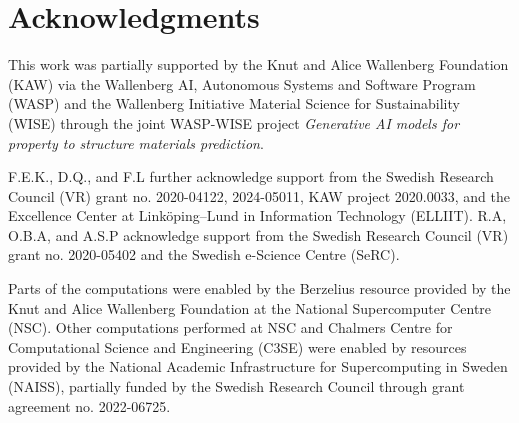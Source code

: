 \section*{Acknowledgments}

This work was partially supported by
the Knut and Alice Wallenberg Foundation (KAW)
via the
Wallenberg AI, Autonomous Systems and Software Program (WASP)
and the
Wallenberg Initiative Material Science for Sustainability (WISE)
through the joint WASP-WISE project \textit{Generative AI models for property to structure materials prediction}.


F.E.K., D.Q., and F.L further acknowledge support from the Swedish Research Council (VR) grant no. 2020-04122, 2024-05011,
KAW project 2020.0033,
and
the Excellence Center at Linköping--Lund in Information Technology (ELLIIT).
R.A, O.B.A, and A.S.P acknowledge support from the Swedish Research Council (VR) grant no. 2020-05402 and the Swedish e-Science Centre (SeRC). 

Parts of the computations were enabled by the Berzelius resource provided by the Knut and Alice Wallenberg Foundation at the National Supercomputer Centre (NSC). Other computations performed at NSC and Chalmers Centre for Computational Science and Engineering (C3SE) were enabled by resources provided by the National Academic Infrastructure for Supercomputing in Sweden (NAISS), partially funded by the Swedish Research Council through grant agreement no. 2022-06725. 

